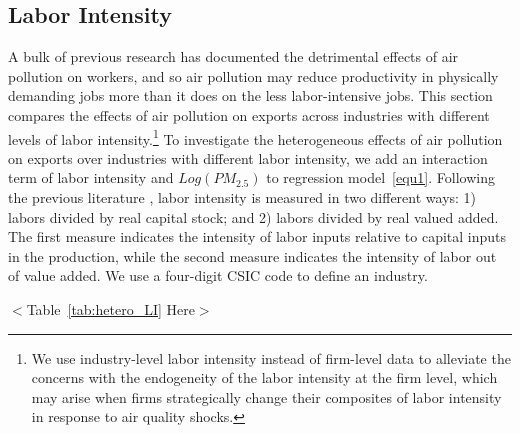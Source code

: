 \documentclass[12pt]{article}
\begin{document}
 \subsection{Labor Intensity}  \label{sec:5.2.2}
 A bulk of previous research \citep[e.g.,][]{chang2016particulate,Adhvaryu2022} has documented the detrimental effects of air pollution on workers, and so air pollution may reduce productivity in physically demanding jobs more than it does on the less labor-intensive jobs. This section compares the effects of air pollution on exports across industries with different levels of labor intensity.\footnote{  
 We use industry-level labor intensity instead of firm-level data to alleviate the concerns with the endogeneity of the labor intensity at the firm level, which may arise when firms strategically change their composites of labor intensity in response to air quality shocks.} To investigate the heterogeneous effects of air pollution on exports over industries with different labor intensity, we add an interaction term of labor intensity and $Log(PM_{2.5})$ to regression model~\ref{equ1}. Following the previous literature \citep{dewenter2001state}, labor intensity is measured in two different ways: 1) labors divided by real capital stock; and 2) labors divided by real valued added. The first measure indicates the intensity of labor inputs relative to capital inputs in the production, while the second measure indicates the intensity of labor out of value added. We use a four-digit CSIC code to define an industry. 


\begin{center}
  $<$Table~\ref{tab:hetero_LI} Here$>$
\end{center}
\end{document}
